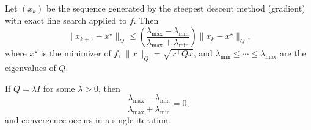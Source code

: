 \begin{theoreme}[Luenberger]
\label{thm:Luenberger}
Let $(x_k)$ be the sequence generated by the steepest descent method (gradient) with
exact line search applied to $f$. Then
\[
    \|x_{k+1} - x^\star\|_Q
    \le \left( \frac{\lambda_{\max} - \lambda_{\min}}
                    {\lambda_{\max} + \lambda_{\min}} \right)
       \|x_k - x^\star\|_Q,
\]
where $x^\star$ is the minimizer of $f$, $\|x\|_Q = \sqrt{x^\top Q x}$, and
$\lambda_{\min} \le \cdots \le \lambda_{\max}$ are the eigenvalues of $Q$.
\end{theoreme}

\begin{exemple}
If $Q = \lambda I$ for some $\lambda>0$, then
\[
    \frac{\lambda_{\max} - \lambda_{\min}}
         {\lambda_{\max} + \lambda_{\min}} = 0,
\]
and convergence occurs in a single iteration.
\end{exemple}

